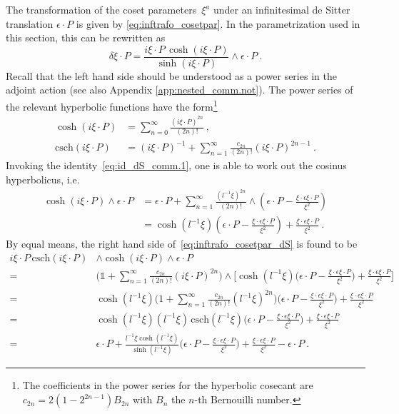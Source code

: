 \documentclass[11pt]{article}
\begin{document}
The transformation of the coset parameters~$\xi^a$ under an 
infinitesimal de Sitter translation $\epsilon\cdot P$ is given by 
\eqref{eq:inftrafo_cosetpar}. In the parametrization used in this 
section, this can be rewritten as
%
\begin{equation}\label{eq:inftrafo_cosetpar_dS}
	\delta\xi \cdot P = \frac{i\xi\cdot P\,\cosh(i\xi\cdot 
		P)}{\sinh(i\xi\cdot P)} \wedge \epsilon\cdot P~.
\end{equation}
Recall that the left hand side should be understood as a
power series in the adjoint action (see also Appendix 
\ref{app:nested_comm.not}).  The power series of the relevant 
hyperbolic functions have the form\footnote{The coefficients in 
	the power series for the hyperbolic cosecant are $c_{2n} = 
	2(1-2^{2n-1}) B_{2n}$ with $B_n$ the $n$-th Bernouilli 
	number.}
%
\begin{align*}
	\cosh(i\xi\cdot P) &= \sum_{n=0}^\infty \frac{(i\xi\cdot 
		P)^{2n}}{(2n)!}~, \\
	\mathrm{csch}(i\xi\cdot P) &= (i\xi\cdot P)^{-1} + 
	\sum_{n=1}^\infty \frac{c_{2n}}{(2n)!} (i\xi\cdot P)^{2n-1}~.
\end{align*}
%
Invoking the identity~\eqref{eq:id_dS_comm.1}, one is able to 
work out the cosinus hyperbolicus, i.e.~ 
%
\begin{equation}\label{eq:cosh_transl_dS}
\begin{split}
	\cosh(i\xi\cdot P) \wedge \epsilon\cdot P
	&= \epsilon\cdot P + \sum_{n=1}^\infty 
	\frac{(l^{-1}\xi)^{2n}}{(2n)!} \wedge \left(\epsilon\cdot P - 
		\frac{\xi\cdot\epsilon \xi\cdot P}{\xi^2} \right) \\
	&= \cosh(l^{-1}\xi) \left(\epsilon\cdot P - 
		\frac{\xi\cdot\epsilon \xi\cdot P}{\xi^2} \right) + 
	\frac{\xi\cdot\epsilon \xi\cdot P}{\xi^2}~.
\end{split}
\end{equation}
By equal means, the right hand side 
of~\eqref{eq:inftrafo_cosetpar_dS} is found to be
\begin{displaymath}
\begin{split}
	i\xi\cdot P \,\mathrm{csch}(i\xi\cdot P) &\wedge 
	\cosh(i\xi\cdot P) \wedge \epsilon\cdot P \\
	=& \bigg( \mathds{1} + \sum_{n=1}^\infty \frac{c_{2n}}{(2n)!} 
	(i\xi\cdot P)^{2n} \bigg)\wedge \bigg[\cosh(l^{-1}\xi)
	\bigg(\epsilon\cdot P -\frac{\xi\cdot\epsilon \xi\cdot 
		P}{\xi^2}\bigg) + \frac{\xi\cdot\epsilon \xi\cdot P}{\xi^2} 
	\bigg] \\
	=& \cosh(l^{-1}\xi)\bigg(1 + \sum_{n=1}^\infty 
	\frac{c_{2n}}{(2n)!}(l^{-1}\xi)^{2n} \bigg) 
	\bigg(\epsilon\cdot P -\frac{\xi\cdot\epsilon \xi\cdot 
		P}{\xi^2}\bigg) + \frac{\xi\cdot\epsilon \xi\cdot P}{\xi^2} 
	\\
	=& \cosh(l^{-1}\xi)(l^{-1}\xi)\,\mathrm{csch}(l^{-1}\xi) 
	\bigg(\epsilon\cdot P -\frac{\xi\cdot\epsilon \xi\cdot 
		P}{\xi^2}\bigg) + \frac{\xi\cdot\epsilon \xi\cdot P}{\xi^2} 
	\\
	=& \epsilon\cdot P + \frac{l^{-1}\xi	
		\cosh(l^{-1}\xi)}{\sinh(l^{-1}\xi)} \bigg(\epsilon\cdot P - 
	\frac{\xi\cdot\epsilon \xi\cdot P}{\xi^2}\bigg) + 
	\frac{\xi\cdot\epsilon \xi\cdot P}{\xi^2} - \epsilon\cdot P ~.
\end{split}
\end{displaymath}
\end{document}

